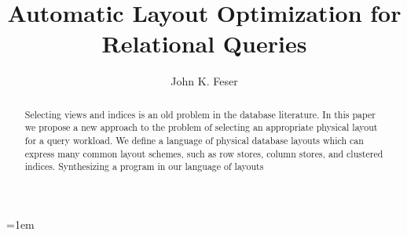 \documentclass{vldb}
\title{Automatic Layout Optimization for Relational Queries}
\author{John K. Feser}
\begin{document}
\maketitle

\begin{abstract}
  Selecting views and indices is an old problem in the database literature. In
  this paper we propose a new approach to the problem of selecting an
  appropriate physical layout for a query workload. We define a language of
  physical database layouts which can express many common layout schemes, such
  as row stores, column stores, and clustered indices. Synthesizing a program in
  our language of layouts 
\end{abstract}








\emergencystretch=1em
\printbibliography
\balance
\end{document}

